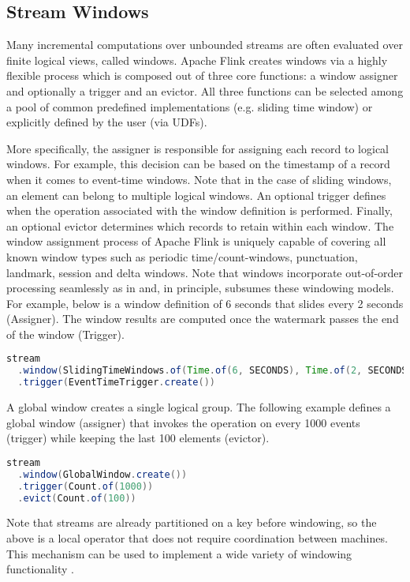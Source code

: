 \subsection{Stream Windows}
Many incremental computations over unbounded streams are often evaluated over finite logical views, called windows. Apache Flink creates windows via a highly flexible process which is composed out of three core functions: a window assigner and optionally a trigger and an evictor. All three functions can be selected among a pool of common predefined implementations (e.g. sliding time window) or explicitly defined by the user (via UDFs).

More specifically, the assigner is responsible for assigning each record to logical windows. For example, this decision can be based on the timestamp of a record when it comes to event-time windows. Note that in the case of sliding windows, an element can belong to multiple logical windows. An optional trigger defines when the operation associated with the window definition is performed. Finally, an optional evictor determines which records to retain within each window. The window assignment process of Apache Flink is uniquely capable of covering all known window types such as periodic time/count-windows, punctuation, landmark, session and delta windows. Note that windows incorporate out-of-order processing seamlessly as in \cite{li2005semantics, akidau2015dataflow} and, in principle, subsumes these windowing models. For example, below is a window definition of 6 seconds that slides every 2 seconds (Assigner). The window results are computed once the watermark passes the end of the window (Trigger).

\begin{lstlisting}[language=Java]
stream
  .window(SlidingTimeWindows.of(Time.of(6, SECONDS), Time.of(2, SECONDS))
  .trigger(EventTimeTrigger.create())
\end{lstlisting}

A global window creates a single logical group. The following example defines a global window (assigner) that invokes the operation on every 1000 events (trigger) while keeping the last 100 elements (evictor). 

\begin{lstlisting}[language=Java]
stream
  .window(GlobalWindow.create())
  .trigger(Count.of(1000))
  .evict(Count.of(100))
\end{lstlisting}

Note that streams are already partitioned on a key before windowing, so the above is a local operator that does not require coordination between machines. This mechanism can be used to implement a wide variety of windowing functionality \cite{akidau2015dataflow}. 





